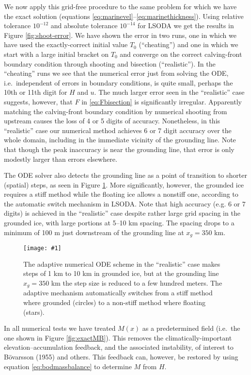\documentclass[review,letterpaper]{igs}
\renewcommand{\dh}{\fontencoding{T1}\selectfont{\symbol{240}}}
\newcommand{\onecol}[1]{\texttt{[image: \#1]}}
\newcommand{\citebod}{B\"o\dh varsson (1955)\nocite{Bodvardsson}\xspace}
\begin{document}
We now apply this grid-free procedure to the same problem for which we have the exact solution (equations \eqref{eq:marinevel}--\eqref{eq:marinethickness}).  Using relative tolerance $10^{-12}$ and absolute tolerance $10^{-14}$ for LSODA we get the results in Figure \ref{fig:shoot-error}.  We have shown the error in two runs, one in which we have used the exactly-correct initial value $T_0$ (``cheating'') and one in which we start with a large initial bracket on $T_0$ and converge on the correct calving-front boundary condition through shooting and bisection (``realistic'').  In the ``cheating'' runs we see that the numerical error just from solving the ODE, i.e.~independent of errors in boundary conditions, is quite small, perhaps the 10th or 11th digit for $H$ and $u$.  The much larger error seen in the ``realistic'' case suggests, however, that $F$ in \eqref{eq:Fbisection} is significantly irregular.  Apparently matching the calving-front boundary condition by numerical shooting from upstream causes the loss of 4 or 5 digits of accuracy.  Nonetheless, in this ``realistic'' case our numerical method achieves 6 or 7 digit accuracy over the whole domain, including in the immediate vicinity of the grounding line.  Note that though the peak inaccuracy is near the grounding line, that error is only modestly larger than errors elsewhere.

The ODE solver also detects the grounding line as a point of transition to shorter (spatial) steps, as seen in Figure \ref{fig:shoot-dt-adaptive}.  More significantly, however, the grounded ice requires a stiff method while the floating ice allows a nonstiff one, according to the automatic switch mechanism in LSODA.  Note that high accuracy (e.g. 6 or 7 digits) is achieved in the ``realistic'' case despite rather large grid spacing in the grounded ice, with large portions at 5--10 km spacing.  The spacing drops to a minimum of 100 m just downstream of the grounding line at $x_g=350$ km.

\begin{figure}[ht]
\onecol{em-dt-adaptive}
\caption{The adaptive numerical ODE scheme in the ``realistic'' case makes steps of 1 km to 10 km in grounded ice, but at the grounding line $x_g=350$ km the step size is reduced to a few hundred meters.  The adaptive mechanism automatically switches from a stiff method where grounded (circles) to a non-stiff method where floating (stars).} \label{fig:shoot-dt-adaptive}
\end{figure}

In all numerical tests we have treated $M(x)$ as a predetermined field (i.e.~the one shown in Figure \ref{fig:exactMB}).  This removes the climatically-important elevation--accumulation feedback, and the associated instability, of interest to \citebod and others.  This feedback can, however, be restored by using equation \eqref{eq:bodmassbalance} to determine $M$ from $H$.
\end{document}
